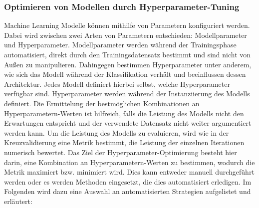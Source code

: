 \pagebreak

\subsubsection*{Optimieren von Modellen durch Hyperparameter-Tuning}\label{hyper_params}
Machine Learning Modelle können mithilfe von Parametern konfiguriert werden. Dabei wird zwischen zwei Arten von Parametern entschieden: Modellparameter und Hyperparameter.
Modellparameter werden während der Trainingsphase automatisiert, direkt durch den Trainingsdatensatz bestimmt und sind nicht von Außen zu manipulieren. Dahingegen bestimmen Hyperparameter unter anderem, wie sich das Modell während der Klassifikation verhält und beeinflussen dessen Architektur. Jedes Modell definiert hierbei selbst, welche Hyperparameter verfügbar sind. Hyperparameter werden während der Instanziierung des Modells definiert. Die Ermittelung der bestmöglichen Kombinationen an Hyperparametern-Werten ist hilfreich, falls die Leistung des Modells nicht den Erwartungen entspricht und der verwendete Datensatz nicht weiter argumentiert werden kann.
Um die Leistung des Modells zu evaluieren, wird wie in der Kreuzvalidierung eine Metrik bestimmt, die Leistung der einzelnen Iterationen numerisch bewertet. Das Ziel der Hyperparameter-Optimierung besteht hier darin, eine Kombination an Hyperparametern-Werten zu bestimmen, wodurch die Metrik maximiert bzw. minimiert wird. 
Dies kann entweder manuell durchgeführt werden oder es werden Methoden eingesetzt, die dies automatisiert erledigen. Im Folgenden wird dazu eine Auswahl an automatisierten Strategien aufgelistet und erläutert:

